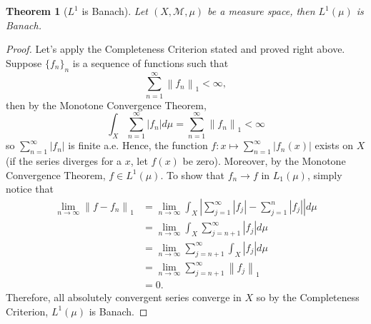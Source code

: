 \documentclass[12pt]{article}
\newtheorem*{theorem}{Theorem}
\newcommand{\M}{\mathcal{M}}
\newcommand{\lnorm}[2]{\left\lVert#2 \right\rVert_{#1}}
\newcommand{\abs}[1]{\left\lvert#1 \right\rvert}
\begin{document}
\begin{theorem}[$L^1$ is Banach]
    Let $(X, \M, \mu)$ be a measure space, then $L^1(\mu)$ is Banach.
\end{theorem}

\begin{proof}
    Let's apply the Completeness Criterion stated and proved right above. Suppose $\{f_n\}_n$ is a sequence of functions such that 
    $$\sum_{n=1}^{\infty}\lnorm{1}{f_n} < \infty,$$
    then by the Monotone Convergence Theorem, 
    $$\int_X \sum_{n=1}^{\infty}|f_n|d \mu = \sum_{n=1}^{\infty}\lnorm{1}{f_n} < \infty$$
    so $\sum_{n=1}^{\infty}|f_n|$ is finite a.e. Hence, the function $f : x \mapsto \sum_{n=1}^{\infty}|f_n(x)|$ exists on $X$ (if the series diverges for a $x$, let $f(x)$ be zero). Moreover, by the Monotone Convergence Theorem, $f \in L^1(\mu)$. To show that $f_n \to f$ in $L_1(\mu)$, simply notice that
    \begin{align*}
        \lim_{n \rightarrow \infty}\lnorm{1}{f - f_n} &= \lim_{n \rightarrow \infty}\int_X \abs{\sum_{j=1}^{\infty}|f_j| - \sum_{j=1}^{n}|f_j|} d\mu \\
        &= \lim_{n \rightarrow \infty}\int_X \sum_{j=n+1}^{\infty}|f_j| d\mu \\
        &= \lim_{n \rightarrow \infty} \sum_{j=n+1}^{\infty} \int_X |f_j| d\mu \\
        &= \lim_{n \rightarrow \infty} \sum_{j=n+1}^{\infty} \lnorm{1}{f_j}\\
        &= 0.
    \end{align*}
    Therefore, all absolutely convergent series converge in $X$ so by the Completeness Criterion, $L^1(\mu)$ is Banach.
\end{proof}
\end{document}
